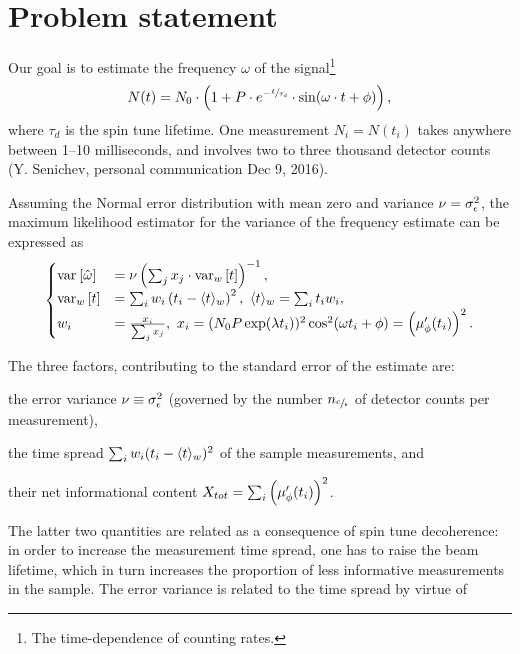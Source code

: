 \documentclass{article}
\begin{document}
	
\section*{Problem statement}

Our goal is to estimate the frequency $\omega$ of the signal\footnote{The time-dependence of counting rates.}
\begin{equation}\label{eq:Signal}
	N(t) = N_0\cdot\bkt{1 + P\cdot e^{-\sfrac{t}{\tau_d}}\cdot\sin(\omega\cdot t + \phi)},
\end{equation}
where $\tau_d$ is the spin tune lifetime. One measurement $N_i = N(t_i)$ takes anywhere between 1--10 milliseconds, and involves two to three thousand detector counts (Y. Senichev, personal communication Dec 9, 2016).

Assuming the Normal error distribution with mean zero and variance $\nu = \SD{\meas}^2$, the maximum likelihood estimator for the variance of the frequency estimate can be expressed as
\begin{equation}
\begin{cases}
\var{\hat\omega} &= \nu\bkt{\sum_j x_j\cdot \var[w]{t}}^{-1}, \\
\var[w]{t} &= \sum_i w_i \bkt{t_i - \avg{t}_w}^2,~ \avg{t}_w = \sum_i t_i w_i, \\
w_i &= \frac{x_i}{\sum_j x_j},~ x_i = (N_0P\exp(\lambda t_i))^2\cos^2(\omega t_i + \phi) = \bkt{\mupp}^2.
\end{cases}	
\end{equation}

The three factors, contributing to the standard error of the estimate are:
\begin{inparaenum}
	\item the error variance $\nu \equiv \SD{\meas}^2$ (governed by the number $n_{\sfrac{c}{\epsilon}}$ of detector counts per measurement), 
	\item the time spread $\sum_i w_i (t_i - \langle t\rangle_w)^2$ of the sample measurements, and
	\item their net informational content $X_{tot} = \sum_i \bkt{\mupp}^2$.
\end{inparaenum}

The latter two quantities are related as a consequence of spin tune decoherence: in order to increase the measurement time spread, one has to raise the beam lifetime, which in turn increases the proportion of less informative measurements in the sample. The error variance is related to the time spread by virtue of 
\end{document}
